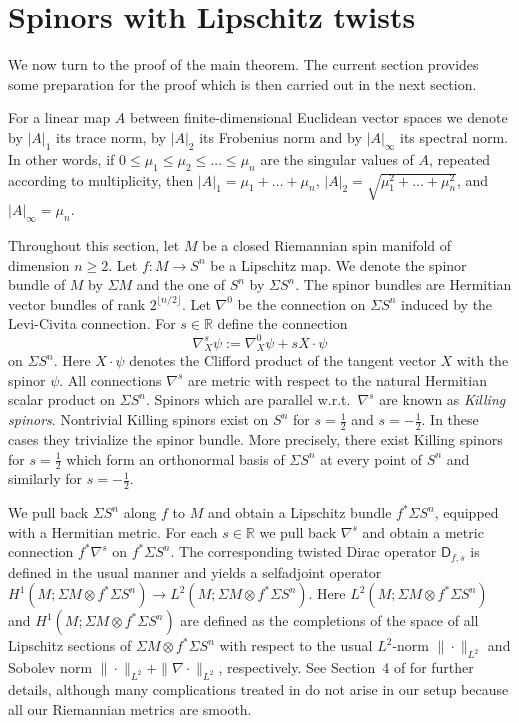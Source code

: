\documentclass[11pt,reqno]{amsart}
\newcommand{\ns}{\nabla^s}
\newcommand{\nn}{\nabla^0}
\newcommand{\R}{\mathbb{R}}
\newcommand{\D}{\mathsf{D}}
\newcommand{\<}{\langle}
\renewcommand{\>}{\rangle}
\theoremstyle{definition}
\begin{document}
\section{Spinors with Lipschitz twists}
\label{sec.LipschitzTwists}

We now turn to the proof of the main theorem.
The current section provides some preparation for the proof which is then carried out in the next section.

For a linear map $A$ between finite-dimensional Euclidean vector spaces we denote by $|A|_1$ its trace norm, by $|A|_2$ its Frobenius norm and by $|A|_\infty$ its spectral norm.
In other words, if $0\le\mu_1\le\mu_2\le \dots \le \mu_n$ are the singular values of $A$, repeated according to multiplicity, then $|A|_1=\mu_1 + \dots + \mu_n$, $|A|_2=\sqrt{\mu_1^2 + \dots + \mu_n^2}$, and $|A|_\infty=\mu_n$.

Throughout this section, let $M$ be a closed Riemannian spin manifold of dimension $n\ge2$.
Let $f\colon M\to S^n$ be a Lipschitz map.
We denote the spinor bundle of $M$ by $\Sigma M$ and the one of $S^n$ by $\Sigma S^n$.
The spinor bundles are Hermitian vector bundles of rank $2^{\lfloor n/2\rfloor}$.
Let $\nn$ be the connection on $\Sigma S^n$ induced by the Levi-Civita connection.
For $s\in\R$ define the connection
\[
\ns_X\psi := \nn_X\psi + s X\cdot \psi 
\]
on $\Sigma S^n$.
Here $X\cdot\psi$ denotes the Clifford product of the tangent vector $X$ with the spinor $\psi$.
All connections $\ns$ are metric with respect to the natural Hermitian scalar product on $\Sigma S^n$.
Spinors which are parallel w.r.t.\ $\ns$ are known as \emph{Killing spinors}.
Nontrivial Killing spinors exist on $S^n$ for $s=\frac12$ and $s=-\frac12$.
In these cases they trivialize the spinor bundle.
More precisely, there exist Killing spinors for $s=\frac12$ which form an orthonormal basis of $\Sigma S^n$ at every point of $S^n$ and similarly for $s=-\frac12$.

We pull back $\Sigma S^n$ along $f$ to $M$ and obtain a Lipschitz bundle $f^*\Sigma S^n$, equipped with a Hermitian metric.
For each $s\in\R$ we pull back $\ns$ and obtain a metric connection $f^*\ns$ on $f^*\Sigma S^n$.
The corresponding twisted Dirac operator $\D_{f,s}$ is defined in the usual manner and yields a selfadjoint operator $H^1(M;\Sigma M\otimes f^*\Sigma S^n) \to L^2(M;\Sigma M\otimes f^*\Sigma S^n)$.
Here $L^2(M;\Sigma M\otimes f^*\Sigma S^n)$ and $H^1(M;\Sigma M\otimes f^*\Sigma S^n)$ are defined as the completions of the space of all Lipschitz sections of $\Sigma M\otimes f^*\Sigma S^n$ with respect to the usual $L^2$-norm $\|\cdot\|_{L^2}$ and Sobolev norm $\|\cdot\|_{L^2}+\|\nabla\cdot\|_{L^2}$, respectively.
See Section~4 of \cite{CHS} for further details, although many complications treated in \cite{CHS} do not arise in our setup because all our Riemannian metrics are smooth.
\end{document}
